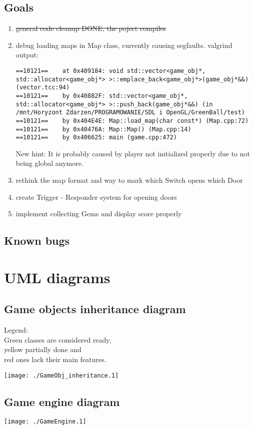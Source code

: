 \documentclass[11pt,a4paper,oneside]{report}
\begin{document}
\section{Goals}
\begin{enumerate}
	\item \st{general code cleanup DONE, the poject compiles}
	\item debug loading maps in Map class, currently causing segfaults. valgrind output:
		\begin{lstlisting}
==10121==    at 0x409184: void std::vector<game_obj*, std::allocator<game_obj*> >::emplace_back<game_obj*>(game_obj*&&) (vector.tcc:94)
==10121==    by 0x40882F: std::vector<game_obj*, std::allocator<game_obj*> >::push_back(game_obj*&&) (in /mnt/Horyzont Zdarzen/PROGRAMOWANIE/SDL i OpenGL/GreenBall/test)
==10121==    by 0x404E4E: Map::load_map(char const*) (Map.cpp:72)
==10121==    by 0x40476A: Map::Map() (Map.cpp:14)
==10121==    by 0x406625: main (game.cpp:472)
		\end{lstlisting}
		New hint: It is probably caused by player not initialized properly due to not being global anymore.
	\item rethink the map format and way to mark which Switch opens which Door
	\item create Trigger - Responder system for opening doors
	\item implement collecting Gems and display score properly
\end{enumerate}
\section{Known bugs}

\chapter{UML diagrams}
\section{Game objects inheritance diagram}
Legend:
\\\colorbox{gr}{Green} classes are considered ready, 
\\\colorbox{ye}{yellow} partially done and 
\\\colorbox{re}{red} ones lack their main features.

\texttt{[image: ./GameObj\_inheritance.1]}

\section{Game engine diagram}
\texttt{[image: ./GameEngine.1]}

	
\end{document}
